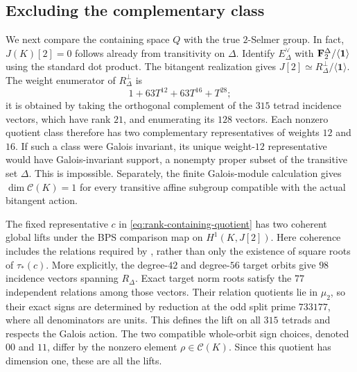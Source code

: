 \subsection{Excluding the complementary class}

We next compare the containing space $Q$ with the true $2$-Selmer group.
In fact, $J(K)[2]=0$ follows already from transitivity on $\Delta$.
Identify $E_\Delta^\vee$ with
$\mathbf F_2^\Delta/\langle\mathbf1\rangle$ using the standard dot product.
The bitangent realization gives
$J[2]\simeq R_\Delta^\perp/\langle\mathbf1\rangle$.
The weight enumerator of $R_\Delta^\perp$ is
\[
                         1+63T^{12}+63T^{16}+T^{28};
\]
it is obtained by taking the orthogonal complement of the $315$ tetrad
incidence vectors, which have rank $21$, and enumerating its $128$ vectors.
Each nonzero quotient class therefore has two complementary
representatives of weights $12$ and $16$.  If such a class were Galois
invariant, its unique weight-$12$ representative would have
Galois-invariant support, a nonempty proper subset of the transitive set
$\Delta$.  This is impossible.  Separately, the finite Galois-module
calculation gives $\dim\mathcal C(K)=1$ for every transitive affine
subgroup compatible with the actual bitangent action.

The fixed representative $c$ in \eqref{eq:rank-containing-quotient}
has two coherent global lifts under the BPS comparison map on
$H^1(K,J[2])$.  Here coherence includes the relations required by
\cite[Lemma~A.13(b)]{BPS}, rather than only the existence of square roots
of $\tau_*(c)$.  More explicitly, the degree-$42$ and degree-$56$
target orbits give $98$ incidence vectors spanning $R_\Delta$.  Exact target
norm roots satisfy the $77$ independent relations among those vectors.
Their relation quotients lie in $\mu_2$, so their exact signs are
determined by reduction at the odd split prime $733177$, where all
denominators are units.  This defines the lift on all $315$ tetrads
and respects the Galois action.  The two compatible whole-orbit sign
choices, denoted $00$ and $11$, differ by the nonzero element
$\rho\in\mathcal C(K)$.  Since this quotient has dimension one,
these are all the lifts.

